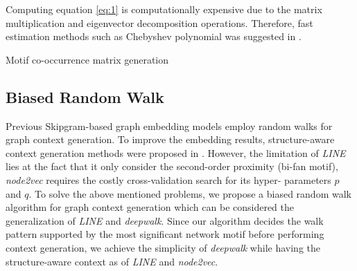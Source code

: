 \documentclass{article}
\theoremstyle{definition}
\begin{document}
Computing equation \ref{eq:1} is computationally expensive
due to the matrix multiplication and eigenvector decomposition operations.
Therefore, fast estimation methods such as Chebyshev polynomial was suggested
in \cite{hammond2011wavelets}.

\begin{algorithm}[h] \label{al:madj}
\caption{Motif co-occurrence matrix generation}
\end{algorithm}

\subsection{Biased Random Walk}

Previous Skipgram-based graph embedding models employ random
walks for graph context generation. To improve the embedding results,
structure-aware context generation methods were proposed in 
\cite{line,node2vec}. However, the limitation of \emph{LINE} lies at the 
fact that it only consider the second-order proximity (bi-fan motif),  
\emph{node2vec} requires the costly cross-validation search for its hyper-
parameters $p$ and $q$. To solve the above mentioned problems, we propose 
a biased random walk algorithm for graph context generation which can be 
considered the generalization of \emph{LINE} and \emph{deepwalk}. Since 
our algorithm decides the walk pattern supported by the most significant 
network motif before performing context generation, we achieve the 
simplicity of \emph{deepwalk} while having the structure-aware context as 
of \emph{LINE} and \emph{node2vec}.
\end{document}
